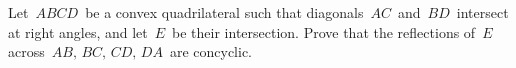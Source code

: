 Let $\, ABCD \,$ be a convex quadrilateral such that diagonals $\, AC \,$ and $\, BD \,$ intersect at right angles, and let $\, E \,$ be their intersection.  Prove that the reflections of $\, E \,$ across $\, AB, \, BC, \, CD, \, DA \,$ are concyclic.